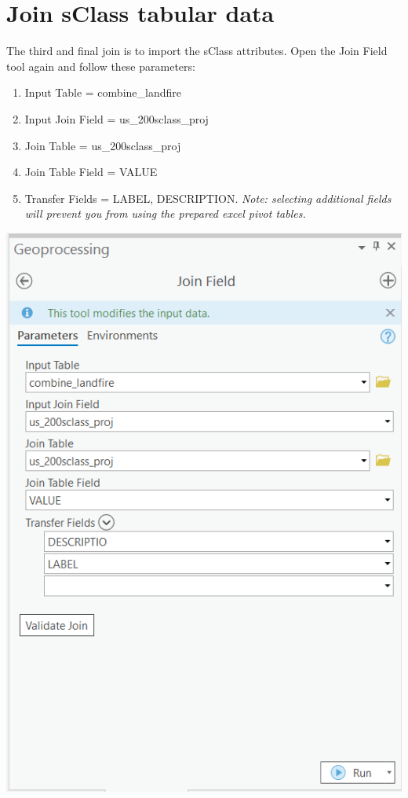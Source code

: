 \documentclass[
]{book}
\providecommand{\tightlist}{%
  \setlength{\itemsep}{0pt}\setlength{\parskip}{0pt}}
\begin{document}
\hypertarget{join-sclass-tabular-data}{%
\section{Join sClass tabular data}\label{join-sclass-tabular-data}}

The third and final join is to import the sClass attributes. Open the Join Field tool again and follow these parameters:

\begin{enumerate}
\def\labelenumi{\arabic{enumi}.}
\tightlist
\item
  Input Table = combine\_landfire
\item
  Input Join Field = us\_200sclass\_proj
\item
  Join Table = us\_200sclass\_proj
\item
  Join Table Field = VALUE
\item
  Transfer Fields = LABEL, DESCRIPTION. \emph{Note: selecting additional fields will prevent you from using the prepared excel pivot tables.}
\end{enumerate}

\includegraphics[width=1000pt]{04_gis_screenshots/10_join_sclass}
\end{document}
